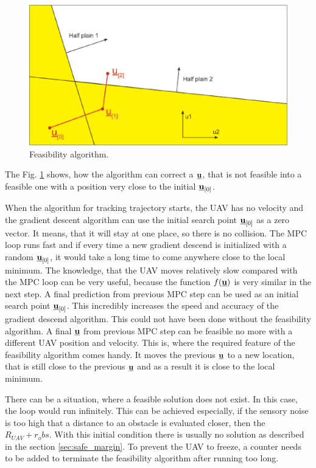 \documentclass[a4paper,11pt,titlepage]{article}
\newcommand{\uvec}{\textbf{\underline{u}}}
\newcommand{\macf}{f(\uvec)}
\begin{document}
\begin{figure}[ht]
\includegraphics[width=1\textwidth]{fig/feasibility_paint.eps}
\caption{Feasibility algorithm.}
\label{fig:feasibility_algorithm}
\end{figure}


The Fig. \ref{fig:feasibility_algorithm} shows, how the algorithm can correct a $\uvec$, that is not feasible into a feasible one with a position very close to the initial $\uvec_{[0]}$. 

When the algorithm for tracking trajectory starts, the UAV has no velocity and the gradient descent algorithm can use the initial search point $\uvec_{[0]}$ as a zero vector. It means, that it will stay at one place, so there is no collision. The MPC loop runs fast and if every time a new gradient descend is initialized with a random $\uvec_{[0]}$, it would take a long time to come anywhere close to the local minimum. The knowledge, that the UAV moves relatively slow compared with the MPC loop can be very useful, because the function $\macf$ is very similar in the next step. A final prediction from previous MPC step can be used as an initial search point $\uvec_{[0]}$. This incredibly increases the speed and accuracy of the gradient descend algorithm. This could not have been done without the feasibility algorithm. A final $\uvec$ from previous MPC step can be feasible no more with a different UAV position and velocity. This is, where the required feature of the feasibility algorithm comes handy. It moves the previous $\uvec$ to a new location, that is still close to the previous $\uvec$ and as a result it is close to the local minimum. 

There can be a situation, where a feasible solution does not exist. In this case, the loop would run infinitely. This can be achieved especially, if the sensory noise is too high that a distance to an obstacle is evaluated closer, then the $R_{UAV} + r_obs$. With this initial condition there is usually no solution as described in the section \ref{sec:safe_margin}. To prevent the UAV to freeze, a counter needs to be added to terminate the feasibility algorithm after running too long.
\end{document}

